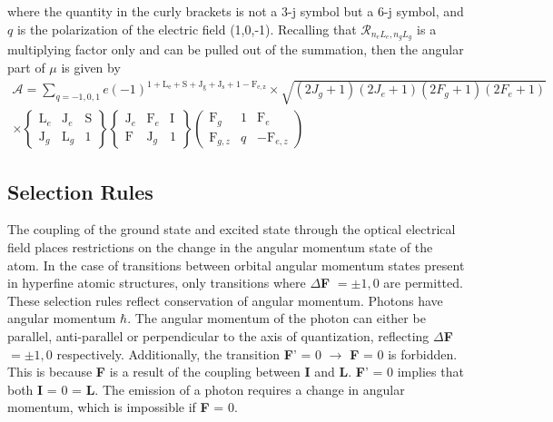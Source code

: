 where the quantity in the curly brackets is not a 3-j symbol but a 6-j symbol, and $q$ is the polarization of the electric field (1,0,-1). Recalling that $\mathcal{R}_{n_e L_e, n_g L_g}$ is a multiplying factor only and can be pulled out of the summation, then the angular part of $\mu$ is given by
\begin{equation}
\begin{split}
\mathcal{A} = \sum_{q = -1,0,1} e (-1)^{\mathrm{1+L_e+S+J_g+J_s+1-F_{e,z}}}
\times \sqrt{(2J_g+1)(2J_e+1)(2F_g+1)(2F_e+1)}\\
\times \left\lbrace
\begin{matrix}
\mathrm{L}_e & \mathrm{J}_e & \mathrm{S}\\
\mathrm{J}_g & \mathrm{L}_g & 1
\end{matrix}
\right\rbrace
\left\lbrace
\begin{matrix}
\mathrm{J}_e & \mathrm{F}_e & \mathrm{I}\\
\mathrm{F} & \mathrm{J}_g &1
\end{matrix}
\right\rbrace
\left(
\begin{matrix}
\mathrm{F}_g & 1 & \mathrm{F}_e\\
\mathrm{F}_{g,z} & q &-\mathrm{F}_{e,z}
\end{matrix}
\right)
\end{split}
\end{equation}


\subsection{Selection Rules}
The coupling of the ground state and excited state through the optical electrical field places restrictions on the change in the angular momentum state of the atom. In the case of transitions between orbital angular momentum states present in hyperfine atomic structures, only transitions where $\Delta$\textbf{F}  $=\pm1,0$ are permitted. These selection rules reflect conservation of angular momentum. Photons have angular momentum $\hbar$. The angular momentum of the photon can either be parallel, anti-parallel or perpendicular to the axis of quantization, reflecting $\Delta$\textbf{F}$=\pm1,0$ respectively. Additionally, the transition \textbf{F}' = 0 $\rightarrow$ \textbf{F} = 0 is forbidden. This is because \textbf{F} is a result of the coupling between \textbf{I} and \textbf{L}. \textbf{F}' = 0 implies that both \textbf{I} = 0 = \textbf{L}. The emission of a photon requires a change in angular momentum, which is impossible if \textbf{F} = 0.

